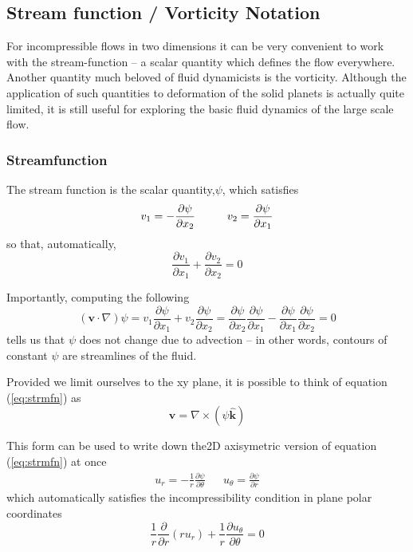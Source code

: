 \documentclass[10pt]{article}
\begin{document}
	
\subsection{Stream function / Vorticity Notation}
			
For incompressible flows in two dimensions it can be very convenient to work
with the stream-function -- a scalar quantity which defines the flow
everywhere. Another quantity much beloved of fluid dynamicists is the
vorticity. Although the application of such quantities to deformation of the
solid planets is actually quite limited, it is still useful for exploring the basic fluid dynamics of the large scale flow.
			
\subsubsection{Streamfunction}
			
		The stream function is the scalar quantity,$\psi$, which satisfies
			\begin{equation}
						v_1 = -\frac{\partial \psi}{\partial x_2} \mbox{\hspace{1cm}}
						v_2 = \frac{\partial \psi}{\partial x_1}
					\label{eq:strmfn}	
			\end{equation}
		so that, automatically, 
			\begin{equation}
				\frac{\partial v_1}{\partial x_1} + \frac{\partial v_2}{\partial x_2} = 0
			\end{equation}	
			
		Importantly, computing the following
			\begin{equation}
				(\mathbf{v} \cdot \nabla) \psi = 
						v_1 \frac{\partial \psi}{\partial x_1} + 	
						v_2 \frac{\partial \psi}{\partial x_2} = 
						\frac{\partial \psi}{\partial x_2} \frac{\partial \psi}{\partial x_1} -
						\frac{\partial \psi}{\partial x_1} \frac{\partial \psi}{\partial x_2} = 0
			\end{equation}
		tells us that $\psi$ does not change due to advection -- in other words, contours
		of constant $\psi$ are streamlines of the fluid.
		
		Provided we limit ourselves to the xy plane, it is possible to 
		think of equation (\ref{eq:strmfn}) as
			\begin{equation}
					\mathbf{v} = \nabla \times (\psi \hat{\mathbf{k}})
			\end{equation}
		
			This form can be used to write down the2D axisymetric version of 
		equation  (\ref{eq:strmfn}) at once
			\begin{eqnarray}
					u_r = -\frac{1}{r}\frac{\partial \psi}{\partial \theta} & & 
					u_\theta = \frac{\partial \psi}{\partial r}
			\end{eqnarray}
		which automatically satisfies the incompressibility condition in plane
		polar coordinates
			\begin{equation}
				\frac{1}{r}\frac{\partial}{\partial r}(ru_r) + \frac{1}{r}\frac{\partial u_\theta}{\partial \theta} = 0
			\end{equation}
		
\end{document}
